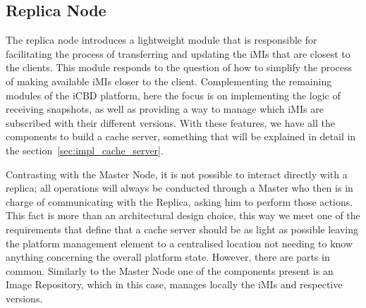


\subsection{Replica Node}
\label{sub:impl_icbdrep_replica_node}

The replica node introduces a lightweight module that is responsible for facilitating the process of transferring and updating the iMIs that are closest to the clients.
This module responds to the question of how to simplify the process of making available iMIs closer to the client. Complementing the remaining modules of the iCBD platform, here the focus is on implementing the logic of receiving snapshots, as well as providing a way to manage which iMIs are subscribed with their different versions. With these features, we have all the components to build a cache server, something that will be explained in detail in the section~\ref{sec:impl_cache_server}.

Contrasting with the Master Node, it is not possible to interact directly with a replica; all operations will always be conducted through a Master who then is in charge of communicating with the Replica, asking him to perform those actions. This fact is more than an architectural design choice, this way we meet one of the requirements that define that a cache server should be as light as possible leaving the platform management element to a centralised location not needing to know anything concerning the overall platform state. However, there are parts in common. Similarly to the Master Node one of the components present is an Image Repository, which in this case, manages locally the iMIs and respective versions.

